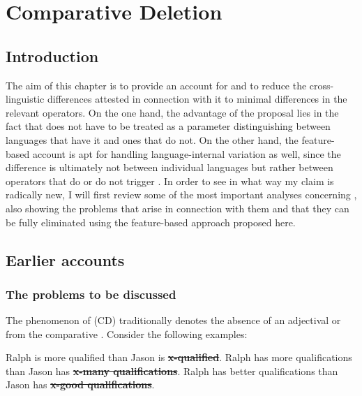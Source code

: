 \chapter {Comparative Deletion} \label{ch:3}
\section {Introduction} \label{sec:3introduction}
The aim of this chapter is to provide an account for  and to reduce the cross-linguistic differences attested in connection with it to minimal  differences in the relevant operators. On the one hand, the advantage of the proposal lies in the fact that  does not have to be treated as a parameter distinguishing between languages that have it and ones that do not. On the other hand, the feature-based account is apt for handling language-internal variation as well, since the difference is ultimately not between individual languages but rather between operators that do or do not trigger . In order to see in what way my claim is radically new, I will first review some of the most important analyses concerning , also showing the problems that arise in connection with them and that they can be fully eliminated using the feature-based approach proposed here.

\section {Earlier accounts} \label{sec:3earlier}
\subsection{The problems to be discussed} \label{sec:3problems}
The phenomenon of  (CD) traditionally denotes the absence of an adjectival or  from the comparative . Consider the following examples:

\ea \label{ch3cd}
\ea Ralph is more qualified than Jason is \sout{\textbf{x-qualified}}.\label{predicative}
\ex Ralph has more qualifications than Jason has \sout{\textbf{x-many qualifications}}.\label{nominal}
\ex Ralph has better qualifications than Jason has \sout{\textbf{x-good qualifications}}.\label{attributive}
\z
\z

